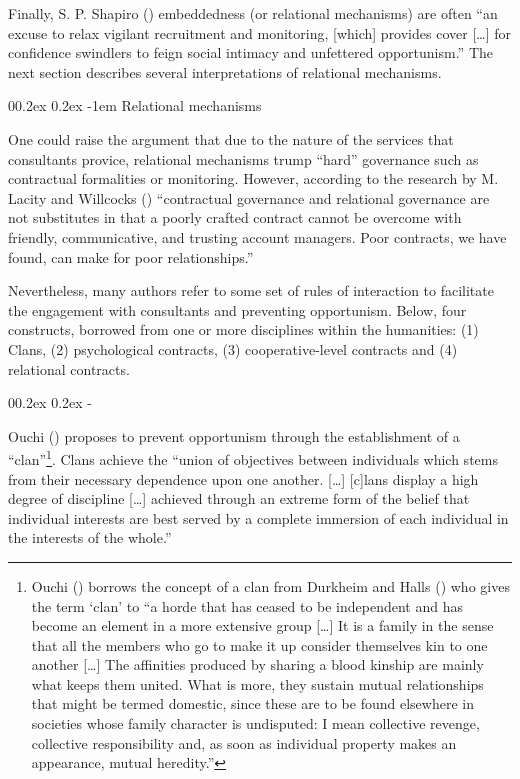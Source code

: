 \documentclass[
  man,floatsintext]{apa6}
\makeatletter
\let\oldparagraph\paragraph
\renewcommand{\paragraph}[1]{\oldparagraph{#1}\mbox{}}
\let\oldsubparagraph\subparagraph
\renewcommand{\subparagraph}[1]{\oldsubparagraph{#1}\mbox{}}
\renewcommand{\paragraph}{\@startsection{paragraph}{4}{\parindent}%
  {0\baselineskip \@plus 0.2ex \@minus 0.2ex}%
  {-1em}%
  {\normalfont\normalsize\bfseries\itshape\typesectitle}}
\renewcommand{\subparagraph}[1]{\@startsection{subparagraph}{5}{1em}%
  {0\baselineskip \@plus 0.2ex \@minus 0.2ex}%
  {-\z@\relax}%
  {\normalfont\normalsize\itshape\hspace{\parindent}{#1}\textit{\addperi}}{\relax}}
\makeatother
\begin{document}
Finally, S. P. Shapiro () embeddedness (or relational mechanisms) are often ``an excuse to relax vigilant recruitment and monitoring, {[}which{]} provides cover {[}\ldots{]} for confidence swindlers to feign social intimacy and unfettered opportunism.'' The next section describes several interpretations of relational mechanisms.

\paragraph{Relational mechanisms}\label{relational-mechanisms}

One could raise the argument that due to the nature of the services that consultants provice, relational mechanisms trump ``hard'' governance such as contractual formalities or monitoring. However, according to the research by M. Lacity and Willcocks () ``contractual governance and relational governance are not substitutes in that a poorly crafted contract cannot be overcome with friendly, communicative, and trusting account managers. Poor contracts, we have found, can make for poor relationships.''

Nevertheless, many authors refer to some set of rules of interaction to facilitate the engagement with consultants and preventing opportunism. Below, four constructs, borrowed from one or more disciplines within the humanities: (1) Clans, (2) psychological contracts, (3) cooperative-level contracts and (4) relational contracts.

\subparagraph{Clans}\label{clans}

Ouchi () proposes to prevent opportunism through the establishment of a ``clan''\footnote{Ouchi () borrows the concept of a clan from Durkheim and Halls () who gives the term `clan' to ``a horde that has ceased to be independent and has become an element in a more extensive group {[}\ldots{]} It is a family in the sense that all the members who go to make it up consider themselves kin to one another {[}\ldots{]} The affinities produced by sharing a blood kinship are mainly what keeps them united. What is more, they sustain mutual relationships that might be termed domestic, since these are to be found elsewhere in societies whose family character is undisputed: I mean collective revenge, collective responsibility and, as soon as individual property makes an appearance, mutual heredity.''}. Clans achieve the ``union of objectives between individuals which stems from their necessary dependence upon one another. {[}\ldots{]} {[}c{]}lans display a high degree of discipline {[}\ldots{]} achieved through an extreme form of the belief that individual interests are best served by a complete immersion of each individual in the interests of the whole.''
\end{document}
